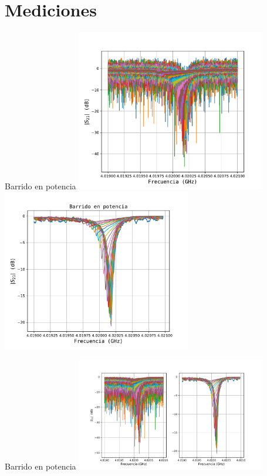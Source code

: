 \documentclass[ignorenonframetext,12pt]{beamer}
\begin{document}
\section{Mediciones}
\begin{frame}{Barrido en potencia}
				\centering
												\includegraphics[width=0.62\textwidth]{resonador0_asc_sin_filtro}
												\includegraphics[width=0.62\textwidth]{resonador0_asc_filtro}
\end{frame}
\begin{frame}{Barrido en potencia}
				\centering
												\includegraphics[width=0.62\textwidth]{res0_full_potencias}
\end{frame}
\end{document}
